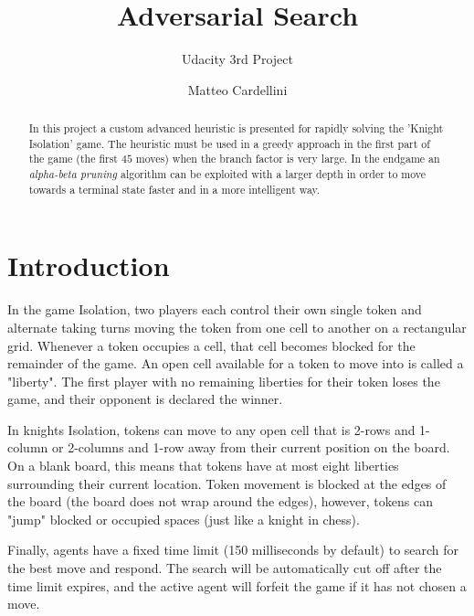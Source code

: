 \documentclass[11pt]{scrartcl}
\begin{document}
\title{Adversarial Search}
\subtitle{Udacity 3rd Project}
\author{Matteo Cardellini}
\maketitle


\begin{abstract}
	In this project a custom advanced heuristic is presented for rapidly solving the 'Knight Isolation' game. The heuristic must be used in a greedy approach in the first part of the game (the first $45$ moves) when the branch factor is very large. In the endgame an \textit{alpha-beta pruning} algorithm can be exploited with a larger depth in order to move towards a terminal state faster and in a more intelligent way. 
\end{abstract}

\section{Introduction}
In the game Isolation, two players each control their own single token and alternate taking turns moving the token from one cell to another on a rectangular grid. Whenever a token occupies a cell, that cell becomes blocked for the remainder of the game. An open cell available for a token to move into is called a "liberty". The first player with no remaining liberties for their token loses the game, and their opponent is declared the winner.

In knights Isolation, tokens can move to any open cell that is 2-rows and 1-column or 2-columns and 1-row away from their current position on the board. On a blank board, this means that tokens have at most eight liberties surrounding their current location. Token movement is blocked at the edges of the board (the board does not wrap around the edges), however, tokens can "jump" blocked or occupied spaces (just like a knight in chess).

Finally, agents have a fixed time limit (150 milliseconds by default) to search for the best move and respond. The search will be automatically cut off after the time limit expires, and the active agent will forfeit the game if it has not chosen a move.
\end{document}
